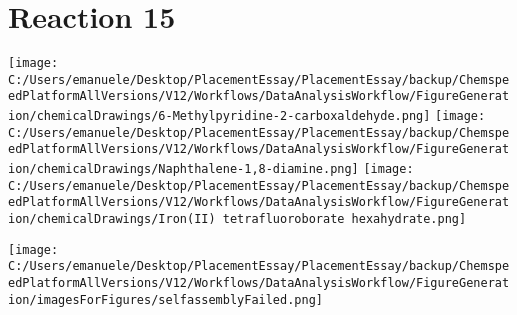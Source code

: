 \documentclass{article}%
\begin{document}
\section*{Reaction 15}%
%
\begin{scheme}[H]%
\begin{minipage}{0.5\textwidth}%
\texttt{[image: C:/Users/emanuele/Desktop/PlacementEssay/PlacementEssay/backup/ChemspeedPlatformAllVersions/V12/Workflows/DataAnalysisWorkflow/FigureGeneration/chemicalDrawings/6-Methylpyridine-2-carboxaldehyde.png]}%
\texttt{[image: C:/Users/emanuele/Desktop/PlacementEssay/PlacementEssay/backup/ChemspeedPlatformAllVersions/V12/Workflows/DataAnalysisWorkflow/FigureGeneration/chemicalDrawings/Naphthalene-1,8-diamine.png]}%
\texttt{[image: C:/Users/emanuele/Desktop/PlacementEssay/PlacementEssay/backup/ChemspeedPlatformAllVersions/V12/Workflows/DataAnalysisWorkflow/FigureGeneration/chemicalDrawings/Iron(II) tetrafluoroborate hexahydrate.png]}%
\end{minipage}%
\begin{minipage}{0.5\textwidth}%
\begin{center}%
\texttt{[image: C:/Users/emanuele/Desktop/PlacementEssay/PlacementEssay/backup/ChemspeedPlatformAllVersions/V12/Workflows/DataAnalysisWorkflow/FigureGeneration/imagesForFigures/selfassemblyFailed.png]}%
\end{center}%
\end{minipage}%
\caption{Self-assembly of components 8, 21, with Iron(II) in a 3.0:1.5:1.0 molar ratio in CH$_3$CN at 60\textdegree C for 40h. These are the reagents (starting materials) for reaction 15.}%
\end{scheme}%
\end{document}
